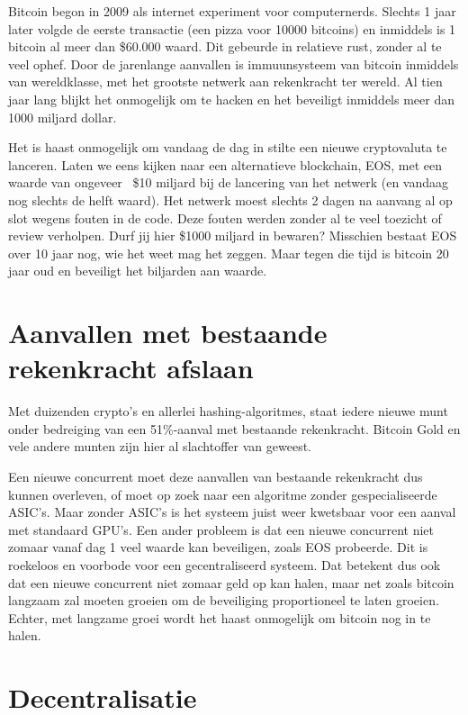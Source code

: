 \documentclass[smalldemyvopaper,11pt,twoside,onecolumn,openright,extrafontsizes]{memoir}
\begin{document}
Bitcoin begon in 2009 als internet experiment voor computernerds. Slechts 1 jaar later volgde de eerste transactie (een pizza voor 10000 bitcoins) en inmiddels is 1 bitcoin al meer dan \$60.000 waard. Dit gebeurde in relatieve rust, zonder al te veel ophef. Door de jarenlange aanvallen is immuunsysteem van bitcoin inmiddels van wereldklasse, met het grootste netwerk aan rekenkracht ter wereld. Al tien jaar lang blijkt het onmogelijk om te hacken en het beveiligt inmiddels meer dan 1000 miljard dollar.

Het is haast onmogelijk om vandaag de dag in stilte een nieuwe cryptovaluta te lanceren. Laten we eens kijken naar een alternatieve blockchain, EOS, met een waarde van ongeveer ~\$10 miljard bij de lancering van het netwerk (en vandaag nog slechts de helft waard). Het netwerk moest slechts 2 dagen na aanvang al op slot wegens fouten in de code. Deze fouten werden zonder al te veel toezicht of review verholpen. Durf jij hier \$1000 miljard in bewaren? Misschien bestaat EOS over 10 jaar nog, wie het weet mag het zeggen. Maar tegen die tijd is bitcoin 20 jaar oud en beveiligt het biljarden aan waarde.  

\section{Aanvallen met bestaande rekenkracht afslaan}

Met duizenden crypto's en allerlei hashing-algoritmes, staat iedere nieuwe munt onder bedreiging van een 51\%-aanval met bestaande rekenkracht. Bitcoin Gold en vele andere munten zijn hier al slachtoffer van geweest.

Een nieuwe concurrent moet deze aanvallen van bestaande rekenkracht dus kunnen overleven, of moet op zoek naar een algoritme zonder gespecialiseerde ASIC's. Maar zonder ASIC's is het systeem juist weer kwetsbaar voor een aanval met standaard GPU's. Een ander probleem is dat een nieuwe concurrent niet zomaar vanaf dag 1 veel waarde kan beveiligen, zoals EOS probeerde. Dit is roekeloos en voorbode voor een gecentraliseerd systeem. Dat betekent dus ook dat een nieuwe concurrent niet zomaar geld op kan halen, maar net zoals bitcoin langzaam zal moeten groeien om de beveiliging proportioneel te laten groeien. Echter, met langzame groei wordt het haast onmogelijk om bitcoin nog in te halen. 

\section{Decentralisatie}
\end{document}
